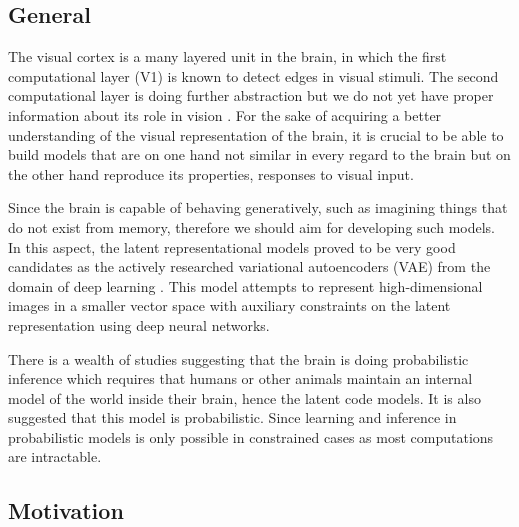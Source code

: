 \documentclass[12pt, english]{article}
\begin{document}
\vspace{7mm}

\subsection{General}

\vspace{7mm}

\par  The visual cortex is a many layered unit in the brain, in which the first computational layer (V1) is known to detect edges in visual stimuli.
The second computational layer is doing further abstraction but we do not yet
have proper information about its role in vision \cite{ZiembaV2}. For the sake of acquiring a
better understanding of the visual representation of the brain, it is crucial to be able to build models that are on one hand not similar in every regard to the brain but on the other hand reproduce its properties, responses to visual input.

\vspace{4mm}

\par Since the brain is capable of behaving generatively, such as imagining things that do not exist from memory, therefore we should aim for developing such models. In this aspect, the latent representational models proved to be very good candidates as the actively researched variational autoencoders (VAE) from the domain of deep learning \cite{kingma2013auto}. This model attempts to represent high-dimensional images in a smaller vector space with auxiliary constraints on the latent representation using deep neural networks.

\vspace{4mm}

\par There is a wealth of studies suggesting that the brain is doing probabilistic inference which requires that humans or other animals maintain an internal model of the world inside their brain, hence the latent code models. It is also suggested that this model is probabilistic. Since learning and inference in probabilistic models is only possible in constrained cases as most computations are intractable.

\vspace{7mm}

\subsection{Motivation}
\end{document}
